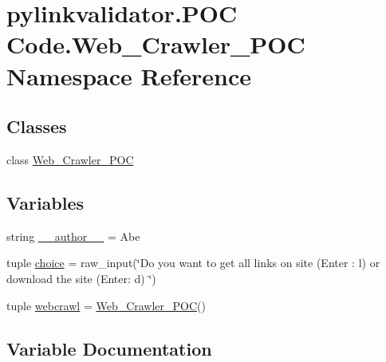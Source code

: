 \hypertarget{namespacepylinkvalidator_1_1_p_o_c_01_code_1_1_web___crawler___p_o_c}{}\section{pylinkvalidator.\+P\+OC Code.\+Web\+\_\+\+Crawler\+\_\+\+P\+OC Namespace Reference}
\label{namespacepylinkvalidator_1_1_p_o_c_01_code_1_1_web___crawler___p_o_c}
\subsection*{Classes}
\begin{DoxyCompactItemize}
\item 
class \hyperlink{classpylinkvalidator_1_1_p_o_c_01_code_1_1_web___crawler___p_o_c_1_1_web___crawler___p_o_c}{Web\+\_\+\+Crawler\+\_\+\+P\+OC}
\end{DoxyCompactItemize}
\subsection*{Variables}
\begin{DoxyCompactItemize}
\item 
string \hyperlink{namespacepylinkvalidator_1_1_p_o_c_01_code_1_1_web___crawler___p_o_c_a22c868491c11af4cb64226ff9b053b32}{\+\_\+\+\_\+author\+\_\+\+\_\+} = \textquotesingle{}Abe\textquotesingle{}
\item 
tuple \hyperlink{namespacepylinkvalidator_1_1_p_o_c_01_code_1_1_web___crawler___p_o_c_a4666fce36918603f23fdc35bf9439a79}{choice} = raw\+\_\+input(\char`\"{}Do you want to get all links on site (Enter \+: l) or download the site (Enter\+: d) \char`\"{})
\item 
tuple \hyperlink{namespacepylinkvalidator_1_1_p_o_c_01_code_1_1_web___crawler___p_o_c_a6207ec383f50bd418bb20f680ae55e1a}{webcrawl} = \hyperlink{classpylinkvalidator_1_1_p_o_c_01_code_1_1_web___crawler___p_o_c_1_1_web___crawler___p_o_c}{Web\+\_\+\+Crawler\+\_\+\+P\+OC}()
\end{DoxyCompactItemize}


\subsection{Variable Documentation}
